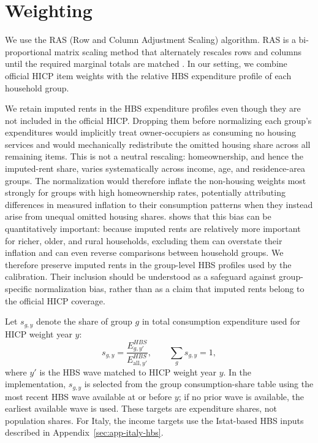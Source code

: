 \documentclass[11pt]{article}
\begin{document}
\section{Weighting}
\label{sec:app-weight-normalization}

We use the RAS (Row and Column Adjustment Scaling) algorithm. RAS is a bi-proportional matrix
scaling method that alternately rescales rows and columns until the required marginal totals are
matched \citep{bacharach1965estimating}. In our setting, we combine official HICP item weights with
the relative HBS expenditure profile of each household group.

We retain imputed rents in the HBS expenditure profiles even though they are not included in the
official HICP. Dropping them before normalizing each group's expenditures would implicitly treat
owner-occupiers as consuming no housing services and would mechanically redistribute the omitted
housing share across all remaining items. This is not a neutral rescaling: homeownership, and hence
the imputed-rent share, varies systematically across income, age, and residence-area groups. The
normalization would therefore inflate the non-housing weights most strongly for groups with high
homeownership rates, potentially attributing differences in measured inflation to their consumption
patterns when they instead arise from unequal omitted housing shares. \citet{geerolf2023inflation}
shows that this bias can be quantitatively important: because imputed rents are relatively more
important for richer, older, and rural households, excluding them can overstate their inflation and
can even reverse comparisons between household groups. We therefore preserve imputed rents in the
group-level HBS profiles used by the calibration. Their inclusion should be understood as a safeguard
against group-specific normalization bias, rather than as a claim that imputed rents belong to the
official HICP coverage.

Let $s_{g,y}$ denote the share of group $g$ in total consumption expenditure used for HICP weight
year $y$:
\begin{equation}
s_{g,y}
=
\frac{E^{HBS}_{g,y'}}{E^{HBS}_{\mathrm{all},y'}},
\qquad
\sum_g s_{g,y}=1,
\end{equation}
where $y'$ is the HBS wave matched to HICP weight year $y$. In the implementation, $s_{g,y}$ is
selected from the group consumption-share table using the most recent HBS wave available at or
before $y$; if no prior wave is available, the earliest available wave is used. These targets are
expenditure shares, not population shares. For Italy, the income targets use the Istat-based HBS
inputs described in Appendix~\ref{sec:app-italy-hbs}.
\end{document}
